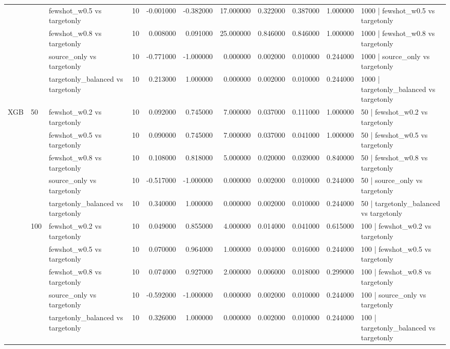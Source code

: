 \begin{tabular}{lllrrrrrrrl}
 &  & fewshot_w0.5 vs targetonly & 10 & -0.001000 & -0.382000 & 17.000000 & 0.322000 & 0.387000 & 1.000000 & 1000 | fewshot_w0.5 vs targetonly \\
 &  & fewshot_w0.8 vs targetonly & 10 & 0.008000 & 0.091000 & 25.000000 & 0.846000 & 0.846000 & 1.000000 & 1000 | fewshot_w0.8 vs targetonly \\
 &  & source_only vs targetonly & 10 & -0.771000 & -1.000000 & 0.000000 & 0.002000 & 0.010000 & 0.244000 & 1000 | source_only vs targetonly \\
 &  & targetonly_balanced vs targetonly & 10 & 0.213000 & 1.000000 & 0.000000 & 0.002000 & 0.010000 & 0.244000 & 1000 | targetonly_balanced vs targetonly \\
\cline{1-11} \cline{2-11}
\multirow[t]{25}{*}{XGB} & \multirow[t]{5}{*}{50} & fewshot_w0.2 vs targetonly & 10 & 0.092000 & 0.745000 & 7.000000 & 0.037000 & 0.111000 & 1.000000 & 50 | fewshot_w0.2 vs targetonly \\
 &  & fewshot_w0.5 vs targetonly & 10 & 0.090000 & 0.745000 & 7.000000 & 0.037000 & 0.041000 & 1.000000 & 50 | fewshot_w0.5 vs targetonly \\
 &  & fewshot_w0.8 vs targetonly & 10 & 0.108000 & 0.818000 & 5.000000 & 0.020000 & 0.039000 & 0.840000 & 50 | fewshot_w0.8 vs targetonly \\
 &  & source_only vs targetonly & 10 & -0.517000 & -1.000000 & 0.000000 & 0.002000 & 0.010000 & 0.244000 & 50 | source_only vs targetonly \\
 &  & targetonly_balanced vs targetonly & 10 & 0.340000 & 1.000000 & 0.000000 & 0.002000 & 0.010000 & 0.244000 & 50 | targetonly_balanced vs targetonly \\
\cline{2-11}
 & \multirow[t]{5}{*}{100} & fewshot_w0.2 vs targetonly & 10 & 0.049000 & 0.855000 & 4.000000 & 0.014000 & 0.041000 & 0.615000 & 100 | fewshot_w0.2 vs targetonly \\
 &  & fewshot_w0.5 vs targetonly & 10 & 0.070000 & 0.964000 & 1.000000 & 0.004000 & 0.016000 & 0.244000 & 100 | fewshot_w0.5 vs targetonly \\
 &  & fewshot_w0.8 vs targetonly & 10 & 0.074000 & 0.927000 & 2.000000 & 0.006000 & 0.018000 & 0.299000 & 100 | fewshot_w0.8 vs targetonly \\
 &  & source_only vs targetonly & 10 & -0.592000 & -1.000000 & 0.000000 & 0.002000 & 0.010000 & 0.244000 & 100 | source_only vs targetonly \\
 &  & targetonly_balanced vs targetonly & 10 & 0.326000 & 1.000000 & 0.000000 & 0.002000 & 0.010000 & 0.244000 & 100 | targetonly_balanced vs targetonly \\

\end{tabular}
